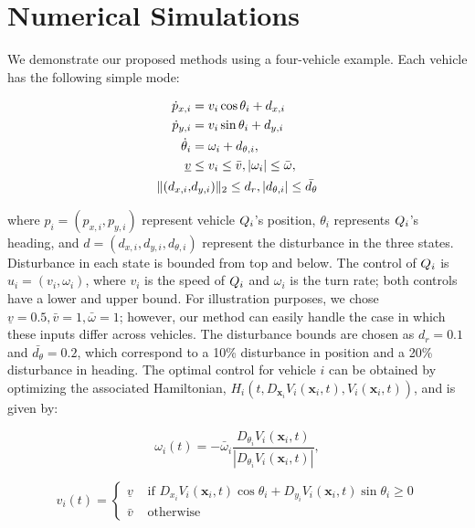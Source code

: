 \section{Numerical Simulations \label{sec:sim}}
We demonstrate our proposed methods using a four-vehicle example. Each vehicle has the following simple mode:

\begin{equation}
\label{eq:dyn_i}
\begin{aligned}
\dot{p}_{x,i} &= v_i \cos \theta_i + d_{x,i} \\
\dot{p}_{y,i} &= v_i \sin \theta_i + d_{y,i}\\
\dot{\theta}_i &= \omega_i + d_{\theta,i}, \\
\underline{v} & \le v_i \le \bar{v}, |\omega_i| \le \bar{\omega},\\
\|(d_{x,i}, & d_{y,i}) \|_2 \le d_{r}, |d_{\theta,i}| \le \bar{d_{\theta}}
\end{aligned}
\end{equation}

\noindent where $p_i = (p_{x,i}, p_{y,i})$ represent vehicle $Q_i$'s position, $\theta_i$ represents $Q_i$'s heading, and $d = (d_{x,i}, d_{y,i}, d_{\theta,i})$ represent the disturbance in the three states. Disturbance in each state is bounded from top and below. The control of $Q_i$ is $u_i = (v_i, \omega_i)$, where $v_i$ is the speed of $Q_i$ and $\omega_i$ is the turn rate; both controls have a lower and upper bound. For illustration purposes, we chose $\underline{v} = 0.5, \bar{v} = 1, \bar\omega = 1$; however, our method can easily handle the case in which these inputs differ across vehicles. The disturbance bounds are chosen as $d_{r} = 0.1$ and $\bar{d_{\theta}} = 0.2$, which correspond to a 10\% disturbance in position and a 20\% disturbance in heading. The optimal control for vehicle $i$ can be obtained by optimizing the associated Hamiltonian, $H_i(t, D_{\bm{x}_i} V_i(\bm{x}_i,t), V_i(\bm{x}_i,t))$, and is given by:

\begin{equation}
\omega_i(t) = -\bar{\omega}_i \frac{D_{\theta_i}V_i(\bm{x}_i,t)}{\left| D_{\theta_i}V_i(\bm{x}_i,t) \right|},
\end{equation}

\begin{equation}
v_i(t) =
\left \{ 
\begin{array}{ll}
\underline{v} & \mbox{ if } D_{x_i}V_i(\bm{x}_i,t) \cos \theta_i + D_{y_i}V_i(\bm{x}_i,t) \sin \theta_i \geq 0 \\
\bar{v} & \mbox{ otherwise } 
\end{array}
\right.
\end{equation}

